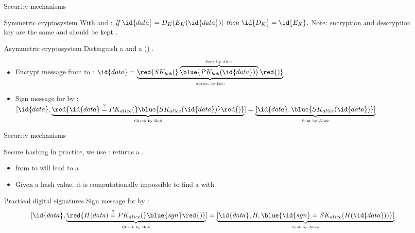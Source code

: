 \begin{slide}{Security mechanisms}
  \begin{block}{Symmetric cryptosystem}
    With  and :
    \(
    \mbox{\itshape if\ } \id{data} = D_K(E_K(\id{data})) \mbox{\itshape \ then\ } \id{D_K} = \id{E_K}.
    \)
    Note: encryption and descryption key are the same and should be kept .
  \end{block}
  \begin{block}{Asymmetric cryptosystem}
    Distinguish a   and a  ()
     .
    \begin{itemize}\tightlist
    \item Encrypt message from  to :
      \(
      \id{data} =
      \underbrace{%
        \red{SK_{bob}(}\overbrace{%
          \blue{PK_{bob}(\id{data})}
        }^{\mbox{\tiny Sent by Alice}}\red{)}
      }_{\mbox{\tiny Action by Bob}}
      \)
    \item Sign message for  by :
      \(
        [\id{data}, \underbrace{%
            \red{\id{data}\stackrel{?}{=}PK_{alice}(}\blue{SK_{alice}(\id{data})}\red{)}
          }_{\mbox{\tiny Check by Bob}}
        ] =
        \underbrace{%
          [\id{data}, \blue{SK_{alice}(\id{data})}]
        }_{\mbox{\tiny Sent by Alice}}
      \)
    \end{itemize}
  \end{block}
\end{slide}
\begin{slide}{Security mechanisms}
  \begin{block}{Secure hashing}
    In practice, we use :  returns a . \vspace*{-6pt}
    \begin{itemize}\tightlist
    \item {} from  to  will lead to a 
      .
    \item Given a hash value, it is computationally impossible to find a  with 
    \end{itemize}
  \end{block}
  \onslide
  \begin{block}{Practical digital signatures}
    Sign message for  by :
      \[
        [\id{data}, \underbrace{%
            \red{H(data)\stackrel{?}{=}PK_{alice}(}\blue{sgn}\red{)}
          }_{\mbox{\tiny Check by Bob}}
        ] =
        \underbrace{%
          [\id{data}, H, \blue{\id{sgn} = SK_{alice}(H(\id{data}))}]
        }_{\mbox{\tiny Sent by Alice}}
      \]
  \end{block}

\end{slide}
